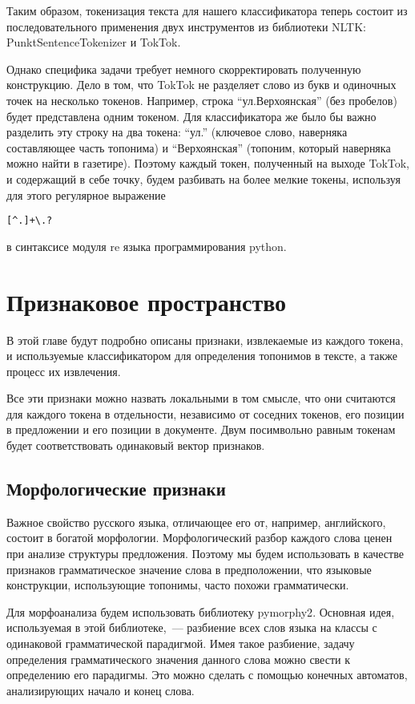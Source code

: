 \documentclass[14pt,russian]{extreport}
\begin{document}
Таким образом, токенизация текста для нашего классификатора теперь состоит из
последовательного применения двух инструментов из библиотеки NLTK:
PunktSentenceTokenizer и TokTok.

Однако специфика задачи требует немного скорректировать полученную конструкцию.
Дело в том, что TokTok не разделяет слово из букв и одиночных точек на
несколько токенов. Например, строка ``ул.Верхоянская'' (без пробелов) будет
представлена одним токеном. Для классификатора же было бы важно разделить эту
строку на два токена: ``ул.'' (ключевое слово, наверняка составляющее часть
топонима) и ``Верхоянская'' (топоним, который наверняка можно найти в
газетире).
Поэтому каждый токен, полученный на выходе TokTok, и содержащий в себе точку,
будем разбивать на более мелкие токены, используя для этого регулярное
выражение
\begin{verbatim}[^.]+\.?\end{verbatim} в синтаксисе модуля re языка
программирования python.

\section{Признаковое пространство}

В этой главе будут подробно описаны признаки, извлекаемые из каждого токена, и
используемые классификатором для определения топонимов в тексте, а также
процесс их извлечения.

Все эти признаки можно назвать локальными в том смысле, что они считаются для
каждого токена в отдельности, независимо от соседних токенов, его позиции
в предложении и его позиции в документе. Двум посимвольно равным токенам будет
соответствовать одинаковый вектор признаков.

\subsection{Морфологические признаки}

Важное свойство русского языка, отличающее его от, например, английского,
состоит в богатой морфологии. Морфологический разбор каждого слова ценен при
анализе структуры предложения. Поэтому мы будем использовать в качестве
признаков грамматическое значение слова в предположении, что языковые
конструкции, использующие топонимы, часто похожи грамматически.

Для морфоанализа будем использовать библиотеку
pymorphy2\cite{pymorphy2}. Основная идея, используемая в этой библиотеке,~---
разбиение всех слов языка на классы с одинаковой грамматической парадигмой.
Имея такое разбиение, задачу определения грамматического значения данного слова
можно свести к определению его парадигмы. Это можно сделать с помощью конечных
автоматов, анализирующих начало и конец слова.
\end{document}
